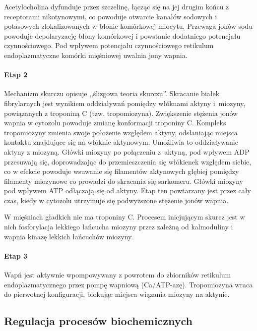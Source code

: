 \noindent Acetylocholina dyfunduje przez szczelinę, łącząc się na jej drugim końcu z receptorami nikotynowymi, co powoduje otwarcie kanałów sodowych i potasowych zlokalizowanych w błonie komórkowej miocytu. Przewaga jonów sodu powoduje depolaryzację błony komórkowej i powstanie dodatniego potencjału czynnościowego. Pod wpływem potencjału czynnościowego retikulum endoplazmatyczne komórki mięśniowej uwalnia jony wapnia.

\paragraph{Etap 2}
Mechanizm skurczu opisuje ,,ślizgowa teoria skurczu''. Skracanie białek fibrylarnych jest wynikiem oddziaływań pomiędzy włóknami aktyny i~miozyny, powiązanych z troponiną C (tzw. tropomiozyna). Zwiększenie stężenia jonów wapnia w cytozolu powoduje zmianę konformacji troponiny C. Kompleks tropomiozyny zmienia swoje położenie względem aktyny, odsłaniając miejsca kontaktu znajdujące się na włóknie aktynowym. Umożliwia to oddziaływanie aktyny z miozyną. Główki miozyny po połączeniu z~aktyną, pod wpływem ADP przesuwają się, doprowadzając do przemieszczenia się włókienek względem siebie, co w efekcie powoduje wsuwanie się filamentów aktynowych głębiej pomiędzy filamenty miozynowe co prowadzi do skracania się sarkomeru. Główki miozyny pod wpływem ATP odłączają się od aktyny. Etap ten powtarzany jest przez cały czas, kiedy w cytozolu utrzymuje się podwyższone stężenie jonów wapnia.

W mięśniach gładkich nie ma troponiny C. Procesem inicjującym skurcz jest w nich fosforylacja lekkiego łańcucha miozyny przez zależną od kalmoduliny i wapnia kinazę lekkich łańcuchów miozyny.

\paragraph{Etap 3}
Wapń jest aktywnie wpompowywany z powrotem do zbiorników retikulum endoplazmatycznego przez pompę wapniową (Ca/ATP-azę). Tropomiozyna wraca do pierwotnej konfiguracji, blokując miejsca wiązania miozyny na aktynie.

\bigskip
\FloatBarrier
\subsection{Regulacja procesów biochemicznych}\label{ss:metabo}

